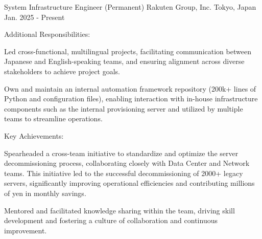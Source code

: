 

\begin{cventries}

  \cventry
    {System Infrastructure Engineer (Permanent)} %
    {Rakuten Group, Inc.} %
    {Tokyo, Japan} %
    {Jan. 2025 - Present} %
    {
      Additional Responsibilities:
      \begin{cvbullets}
        \item Led cross-functional, multilingual projects,
        facilitating communication between Japanese and English-speaking teams,
        and ensuring alignment across diverse stakeholders to achieve project goals.
        \item Own and maintain an internal automation framework repository (200k+ lines of Python and configuration files),
        enabling interaction with in-house infrastructure components such as the internal provisioning server
        and utilized by multiple teams to streamline operations.
      \end{cvbullets}
      Key Achievements:
      \begin{cvbullets}
        \item Spearheaded a cross-team initiative to standardize and optimize the server decommissioning process,
        collaborating closely with Data Center and Network teams.
        This initiative led to the successful decommissioning of 2000+ legacy servers,
        significantly improving operational efficiencies and contributing millions of yen in monthly savings.
        \item Mentored and facilitated knowledge sharing within the team,
        driving skill development and fostering a culture of collaboration and continuous improvement.
      \end{cvbullets}
    }
  

\end{cventries}
